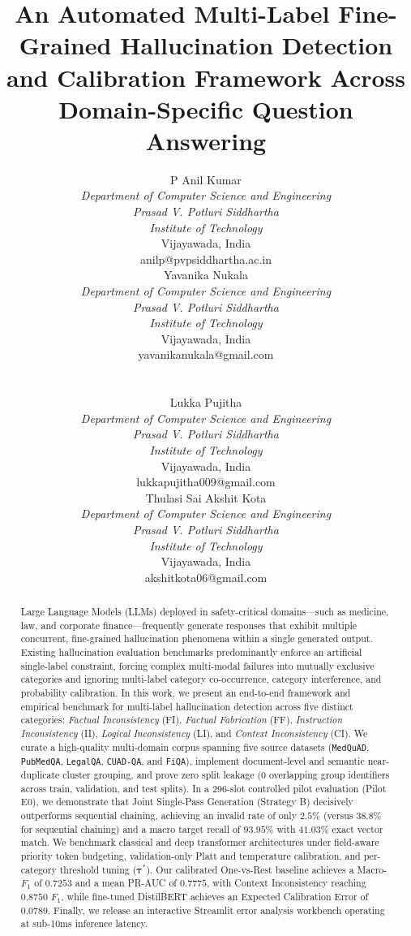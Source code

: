 \documentclass[conference]{IEEEtran}
\newcommand{\authorcell}[4]{%
  \begin{minipage}[t]{0.46\textwidth}
    \centering
    {\normalsize #1}\\[2pt]
    {\small\itshape Department of Computer Science and Engineering}\\
    {\small\itshape Prasad V. Potluri Siddhartha\\Institute of Technology}\\
    {\small #2}\\
    {\small #3}
  \end{minipage}%
}
\begin{document}
\title{An Automated Multi-Label Fine-Grained Hallucination Detection and Calibration Framework Across Domain-Specific Question Answering}

\author{
\authorcell{P Anil Kumar}{Vijayawada, India}{anilp@pvpsiddhartha.ac.in}{}
\hfill
\authorcell{Yavanika Nukala}{Vijayawada, India}{yavanikanukala@gmail.com}{}
\\[12pt]
\authorcell{Lukka Pujitha}{Vijayawada, India}{lukkapujitha009@gmail.com}{}
\hfill
\authorcell{Thulasi Sai Akshit Kota}{Vijayawada, India}{akshitkota06@gmail.com}{}
}

\maketitle

\begin{abstract}
Large Language Models (LLMs) deployed in safety-critical domains—such as medicine, law, and corporate finance—frequently generate responses that exhibit multiple concurrent, fine-grained hallucination phenomena within a single generated output. Existing hallucination evaluation benchmarks predominantly enforce an artificial single-label constraint, forcing complex multi-modal failures into mutually exclusive categories and ignoring multi-label category co-occurrence, category interference, and probability calibration. In this work, we present an end-to-end framework and empirical benchmark for multi-label hallucination detection across five distinct categories: \textit{Factual Inconsistency} (FI), \textit{Factual Fabrication} (FF), \textit{Instruction Inconsistency} (II), \textit{Logical Inconsistency} (LI), and \textit{Context Inconsistency} (CI). We curate a high-quality multi-domain corpus spanning five source datasets (\texttt{MedQuAD}, \texttt{PubMedQA}, \texttt{LegalQA}, \texttt{CUAD-QA}, and \texttt{FiQA}), implement document-level and semantic near-duplicate cluster grouping, and prove zero split leakage ($0$ overlapping group identifiers across train, validation, and test splits). In a 296-slot controlled pilot evaluation (Pilot E0), we demonstrate that Joint Single-Pass Generation (Strategy B) decisively outperforms sequential chaining, achieving an invalid rate of only $2.5\%$ (versus $38.8\%$ for sequential chaining) and a macro target recall of $93.95\%$ with $41.03\%$ exact vector match. We benchmark classical and deep transformer architectures under field-aware priority token budgeting, validation-only Platt and temperature calibration, and per-category threshold tuning ($\boldsymbol{\tau}^*$). Our calibrated One-vs-Rest baseline achieves a Macro-$F_1$ of $0.7253$ and a mean PR-AUC of $0.7775$, with Context Inconsistency reaching $0.8750$ $F_1$, while fine-tuned DistilBERT achieves an Expected Calibration Error of $0.0789$. Finally, we release an interactive Streamlit error analysis workbench operating at sub-10ms inference latency.
\end{abstract}
\end{document}

